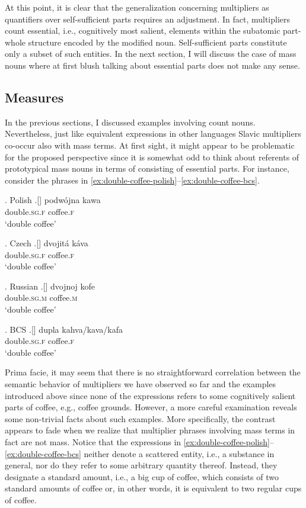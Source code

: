 At this point, it is clear that the generalization concerning multipliers as quantifiers over self-sufficient parts requires an adjustment. In fact, multipliers count essential, i.e., cognitively most salient, elements within the subatomic part-whole structure encoded by the modified noun. Self-sufficient parts constitute only a subset of such entities. In the next section, I will discuss the case of mass nouns where at first blush talking about essential parts does not make any sense.

\subsection{Measures}\label{sec:portions}

In the previous sections, I discussed examples involving count nouns. Nevertheless, just like equivalent expressions in other languages Slavic multipliers co-occur also with mass terms. At first sight, it might appear to be problematic for the proposed perspective since it is somewhat odd to think about referents of prototypical mass nouns in terms of consisting of essential parts. For instance, consider the phrases in \ref{ex:double-coffee-polish}--\ref{ex:double-coffee-bcs}. 

\ex. Polish\label{ex:double-coffee-polish}
\bg.[] podwójna kawa\\
double\textsc{.sg.f} coffee\textsc{.f}\\
`double coffee'

\ex. Czech\label{ex:double-coffee-czech}
\bg.[] dvojitá káva\\
double\textsc{.sg.f} coffee\textsc{.f}\\
`double coffee'

\ex. Russian\label{ex:double-coffee-russian}
\bg.[] dvojnoj kofe\\
double\textsc{.sg.m} coffee\textsc{.m}\\
`double coffee'

\ex. BCS\label{ex:double-coffee-bcs}
\bg.[] dupla kahva/kava/kafa\\
double\textsc{.sg.f} coffee\textsc{.f}\\
`double coffee'

Prima facie, it may seem that there is no straightforward correlation between the semantic behavior of multipliers we have observed so far and the examples introduced above since none of the expressions refers to some cognitively salient parts of coffee, e.g., coffee grounds. However, a more careful examination reveals some non-trivial facts about such examples. More specifically, the contrast appears to fade when we realize that multiplier phrases involving mass terms in fact are not mass. Notice that the expressions in \ref{ex:double-coffee-polish}--\ref{ex:double-coffee-bcs} neither denote a scattered entity, i.e., a substance in general, nor do they refer to some arbitrary quantity thereof. Instead, they designate a standard amount, i.e., a big cup of coffee, which consists of two standard amounts of coffee or, in other words, it is equivalent to two regular cups of coffee.

